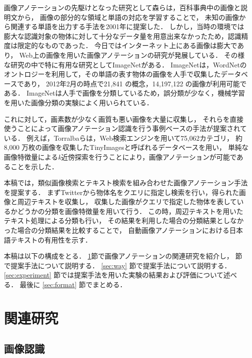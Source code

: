 画像アノテーションの先駆けとなった研究として森ら\cite{mori}は，百科事典中の画像と説明文から，
画像の部分的な領域と単語の対応を学習することで，
未知の画像から関連する単語を出力する手法を2001年に提案した．
しかし，当時の環境では膨大な認識対象の物体に対して十分なデータ量を用意出来なかったため，認識精度は限定的なものであった．
今日ではインターネット上にある画像は膨大であり，
Web上の画像を用いた画像アノテーションの研究が発展している．
その様な研究の中で特に有用な研究としてImageNet\cite{imagenet}がある．
ImageNet\cite{imagenet}は，WordNetのオントロジーを利用して，その単語の表す物体の画像を人手で収集したデータベースであり，
2012年2月の時点で21,841 の概念，14,197,122 の画像が利用可能である．
ImageNetは人手で画像を分類しているため，誤分類が少なく，機械学習を用いた画像分類の実験によく用いられている． 

これに対して，画素数が少なく画質も悪い画像を大量に収集し，
それらを直接使うことによって画像アノテーション認識を行う事例ベースの手法が提案されている．
例えば，Torralba\cite{torralba}らは，Web検索エンジンを用いて75,062カテゴリ，
約8,000 万枚の画像を収集したTinyImagesと呼ばれるデータベースを用い，
単純な画像特徴量による{\it k}近傍探索を行うことにより，画像アノテーションが可能であることを示した．

本稿では，類似画像検索とテキスト検索を組み合わせた画像アノテーション手法を提案する．
まずTwitterから物体名をクエリに指定し検索を行い，得られた画像と周辺テキストを収集し，
収集した画像がクエリで指定した物体を表しているかどうかの分類を画像特徴量を用いて行う．
この時，周辺テキストを用いたテキスト処理による分類も行い，
その結果を利用した場合の分類結果としなかった場合の分類結果を比較することで，
自動画像アノテーションにおける日本語テキストの有用性を示す．


本稿は以下の構成をとる．
\ref{sec:related}節で画像アノテーションの関連研究を紹介し，
節で提案手法について説明する．
\ref{sec:way}
節で提案手法について説明する．
\ref{sec:experiment}
節では提案手法を用いた実験の結果および評価について述べる．
最後に
\ref{sec:format}
節でまとめる．

\chapter{関連研究}
\label{sec:related}

\section{画像認識}

